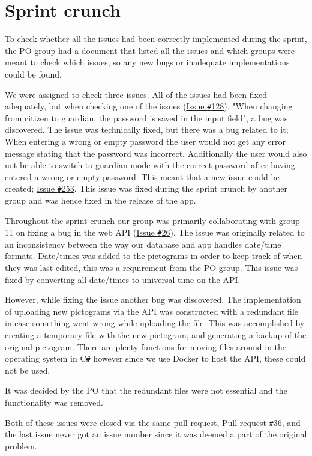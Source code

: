 \section{Sprint crunch}
To check whether all the issues had been correctly implemented during the sprint, the PO group had a document that listed all the issues and which groups were meant to check which issues, so any new bugs or inadequate implementations could be found.

We were assigned to check three issues.
All of the issues had been fixed adequately, but when checking one of the issues (\href{https://github.com/aau-giraf/weekplanner/issues/128}{Issue \texttt{\#}128}), "When changing from citizen to guardian, the password is saved in the input field", a bug was discovered.
The issue was technically fixed, but there was a bug related to it; When entering a wrong or empty password the user would not get any error message stating that the password was incorrect.
Additionally the user would also not be able to switch to guardian mode with the correct password after having entered a wrong or empty password.
This meant that a new issue could be created; \href{https://github.com/aau-giraf/weekplanner/issues/253}{Issue \texttt{\#}253}.
This issue was fixed during the sprint crunch by another group and was hence fixed in the release of the app.

Throughout the sprint crunch our group was primarily collaborating with group 11 on fixing a bug in the web API (\href{https://github.com/aau-giraf/web-api/issues/26}{Issue \texttt{\#}26}).
The issue was originally related to an inconsistency between the way our database and app handles date/time formats. 
Date/times was added to the pictograms in order to keep track of when they was last edited, this was a requirement from the PO group. 
This issue was fixed by converting all date/times to universal time on the API. 

However, while fixing the issue another bug was discovered.
The implementation of uploading new pictograms via the API was constructed with a redundant file in case something went wrong while uploading the file. 
This was accomplished by creating a temporary file with the new pictogram, and generating a backup of the original pictogram. 
There are plenty functions for moving files around in the operating system in C\texttt{\#} however since we use Docker to host the API, these could not be used. 

It was decided by the PO that the redundant files were not essential and the functionality was removed.

Both of these issues were closed via the same pull request, \href{https://github.com/aau-giraf/web-api/pull/36}{Pull request \texttt{\#}36}, and the last issue never got an issue number since it was deemed a part of the original problem. 
